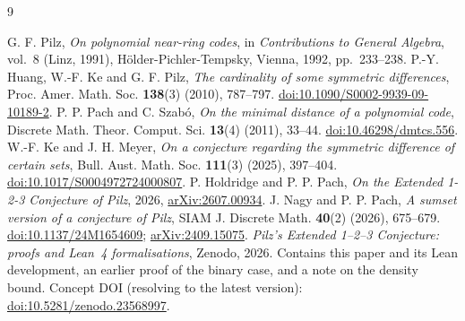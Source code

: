 \documentclass[11pt]{article}
\numberwithin{equation}{section}
\theoremstyle{definition}\newtheorem{definition}[theorem]{Definition}
\theoremstyle{remark}\newtheorem{remark}[theorem]{Remark}
\begin{document}
\clearpage
\begin{thebibliography}{9}
\raggedright
{}
G. F. Pilz,
\emph{On polynomial near-ring codes},
in \emph{Contributions to General Algebra}, vol.~8 (Linz, 1991),
H\"older-Pichler-Tempsky, Vienna, 1992, pp.~233--238.
P.-Y. Huang, W.-F. Ke and G. F. Pilz,
\emph{The cardinality of some symmetric differences},
Proc. Amer. Math. Soc. \textbf{138}(3) (2010), 787--797.
\href{https://doi.org/10.1090/S0002-9939-09-10189-2}
{doi:10.1090/S0002-9939-09-10189-2}.
P. P. Pach and C. Szab\'o,
\emph{On the minimal distance of a polynomial code},
Discrete Math. Theor. Comput. Sci. \textbf{13}(4) (2011), 33--44.
\href{https://doi.org/10.46298/dmtcs.556}
{doi:10.46298/dmtcs.556}.
W.-F. Ke and J. H. Meyer,
\emph{On a conjecture regarding the symmetric difference of certain sets},
Bull. Aust. Math. Soc. \textbf{111}(3) (2025), 397--404.
\href{https://doi.org/10.1017/S0004972724000807}
{doi:10.1017/S0004972724000807}.
P. Holdridge and P. P. Pach,
\emph{On the Extended 1-2-3 Conjecture of Pilz},
2026, \href{https://arxiv.org/abs/2607.00934}{arXiv:2607.00934}.
J. Nagy and P. P. Pach,
\emph{A sumset version of a conjecture of Pilz},
SIAM J. Discrete Math. \textbf{40}(2) (2026), 675--679.
\href{https://doi.org/10.1137/24M1654609}
{doi:10.1137/24M1654609};
\href{https://arxiv.org/abs/2409.15075}{arXiv:2409.15075}.
\emph{Pilz's Extended 1--2--3 Conjecture: proofs and Lean~4
formalisations}, Zenodo, 2026. Contains this paper and its Lean
development, an earlier proof of the binary case, and a note on the
density bound. Concept DOI (resolving to the latest version):
\href{https://doi.org/10.5281/zenodo.23568997}{doi:10.5281/zenodo.23568997}.
\end{thebibliography}
\end{document}
